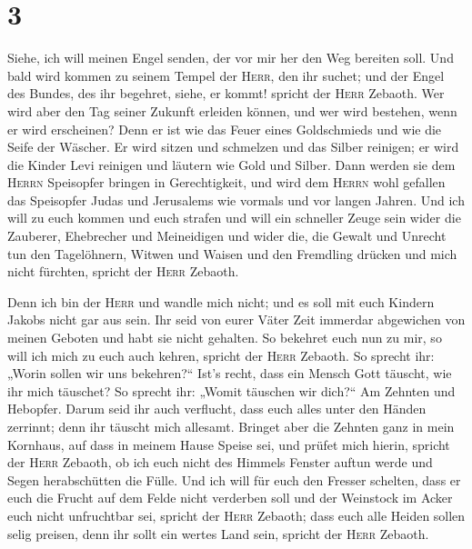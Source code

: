 \hypertarget{section-2}{%
\section{3}\label{section-2}}

 Siehe, ich will meinen Engel senden, der vor mir her den
Weg bereiten soll. Und bald wird kommen zu seinem Tempel der
\textsc{Herr}, den ihr suchet; und der Engel des Bundes, des ihr
begehret, siehe, er kommt! spricht der \textsc{Herr} Zebaoth.
 Wer wird aber den Tag seiner Zukunft erleiden können, und
wer wird bestehen, wenn er wird erscheinen? Denn er ist wie das Feuer
eines Goldschmieds und wie die Seife der Wäscher.  Er wird
sitzen und schmelzen und das Silber reinigen; er wird die Kinder Levi
reinigen und läutern wie Gold und Silber. Dann werden sie dem
\textsc{Herrn} Speisopfer bringen in Gerechtigkeit,  und
wird dem \textsc{Herrn} wohl gefallen das Speisopfer Judas und
Jerusalems wie vormals und vor langen Jahren.  Und ich
will zu euch kommen und euch strafen und will ein schneller Zeuge sein
wider die Zauberer, Ehebrecher und Meineidigen und wider die, die Gewalt
und Unrecht tun den Tagelöhnern, Witwen und Waisen und den Fremdling
drücken und mich nicht fürchten, spricht der \textsc{Herr} Zebaoth.

 Denn ich bin der \textsc{Herr} und wandle mich nicht; und
es soll mit euch Kindern Jakobs nicht gar aus sein.  Ihr
seid von eurer Väter Zeit immerdar abgewichen von meinen Geboten und
habt sie nicht gehalten. So bekehret euch nun zu mir, so will ich mich
zu euch auch kehren, spricht der \textsc{Herr} Zebaoth. So sprecht ihr:
„Worin sollen wir uns bekehren?{}``  Ist's recht, dass ein
Mensch Gott täuscht, wie ihr mich täuschet? So sprecht ihr: „Womit
täuschen wir dich?{}`` Am Zehnten und Hebopfer.  Darum
seid ihr auch verflucht, dass euch alles unter den Händen zerrinnt; denn
ihr täuscht mich allesamt.  Bringet aber die Zehnten ganz
in mein Kornhaus, auf dass in meinem Hause Speise sei, und prüfet mich
hierin, spricht der \textsc{Herr} Zebaoth, ob ich euch nicht des Himmels
Fenster auftun werde und Segen herabschütten die Fülle. 
Und ich will für euch den Fresser schelten, dass er euch die Frucht auf
dem Felde nicht verderben soll und der Weinstock im Acker euch nicht
unfruchtbar sei, spricht der \textsc{Herr} Zebaoth;  dass
euch alle Heiden sollen selig preisen, denn ihr sollt ein wertes Land
sein, spricht der \textsc{Herr} Zebaoth.

